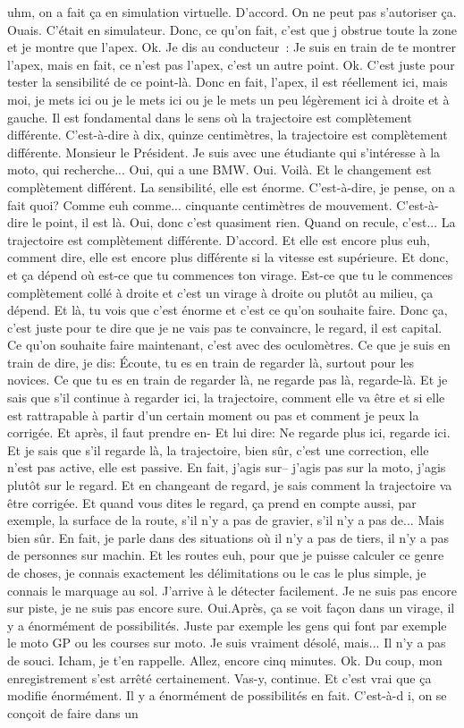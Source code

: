 uhm, on a fait ça en simulation virtuelle. D'accord. On ne peut pas s'autoriser ça. Ouais. C'était en simulateur. Donc, ce qu'on fait, c'est que j obstrue toute la zone et je montre que l'apex. Ok. Je dis au conducteur : Je suis en train de te montrer l'apex, mais en fait, ce n'est pas l'apex, c'est un autre point. Ok. C'est juste pour tester la sensibilité de ce point-là. Donc en fait, l'apex, il est réellement ici, mais moi, je mets ici ou je le mets ici ou je le mets un peu légèrement ici à droite et à gauche. Il est fondamental dans le sens où la trajectoire est complètement différente. C'est-à-dire à dix, quinze centimètres, la trajectoire est complètement différente. Monsieur le Président. Je suis avec une étudiante qui s'intéresse à la moto, qui recherche... Oui, qui a une BMW. Oui. Voilà. Et le changement est complètement différent. La sensibilité, elle est énorme. C'est-à-dire, je pense, on a fait quoi? Comme euh comme... cinquante centimètres de mouvement. C'est-à-dire le point, il est là. Oui, donc c'est quasiment rien. Quand on recule, c'est... La trajectoire est complètement différente. D'accord. Et elle est encore plus euh, comment dire, elle est encore plus différente si la vitesse est supérieure. Et donc, et ça dépend où est-ce que tu commences ton virage. Est-ce que tu le commences complètement collé à droite et c'est un virage à droite ou plutôt au milieu, ça dépend. Et là, tu vois que c'est énorme et c'est ce qu'on souhaite faire. Donc ça, c'est juste pour te dire que je ne vais pas te convaincre, le regard, il est capital. Ce qu'on souhaite faire maintenant, c'est avec des oculomètres. Ce que je suis en train de dire, je dis: Écoute, tu es en train de regarder là, surtout pour les novices. Ce que tu es en train de regarder là, ne regarde pas là, regarde-là. Et je sais que s'il continue à regarder ici, la trajectoire, comment elle va être et si elle est rattrapable à partir d'un certain moment ou pas et comment je peux la corrigée. Et après, il faut prendre en- Et lui dire: Ne regarde plus ici, regarde ici. Et je sais que s'il regarde là, la trajectoire, bien sûr, c'est une correction, elle n'est pas active, elle est passive. En fait, j'agis sur-- j'agis pas sur la moto, j'agis plutôt sur le regard. Et en changeant de regard, je sais comment la trajectoire va être corrigée. Et quand vous dites le regard, ça prend en compte aussi, par exemple, la surface de la route, s'il n'y a pas de gravier, s'il n'y a pas de... Mais bien sûr. En fait, je parle dans des situations où il n'y a pas de tiers, il n'y a pas de personnes sur machin. Et les routes euh, pour que je puisse calculer ce genre de choses, je connais exactement les délimitations ou le cas le plus simple, je connais le marquage au sol. J'arrive à le détecter facilement. Je ne suis pas encore sur piste, je ne suis pas encore sure. Oui.Après, ça se voit façon dans un virage, il y a énormément de possibilités. Juste par exemple les gens qui font par exemple le moto GP ou les courses sur moto. Je suis vraiment désolé, mais... Il n'y a pas de souci. Icham, je t'en rappelle. Allez, encore cinq minutes. Ok. Du coup, mon enregistrement s'est arrêté certainement. Vas-y, continue. Et c'est vrai que ça modifie énormément. Il y a énormément de possibilités en fait. C'est-à-d i, on se conçoit de faire dans un 